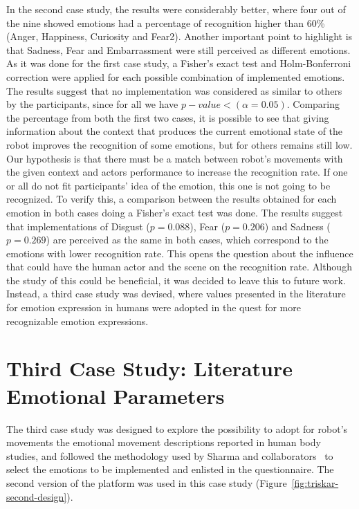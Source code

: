 In the second case study, the results were considerably better, where four out of the nine showed emotions had a percentage of recognition higher than 60\% (Anger, Happiness, Curiosity and Fear2). Another important point to highlight is that Sadness, Fear and Embarrassment were still perceived as different emotions. As it was done for the first case study, a Fisher's exact test and Holm-Bonferroni correction were applied for each possible combination of implemented emotions. The results suggest that no implementation was considered as similar to others by the participants, since for all we have $p-value<(\alpha = 0.05)$. 
Comparing the percentage from both the first two cases, it is possible to see that giving information about the context that produces the current emotional state of the robot improves the recognition of some emotions, but for others remains still low. Our hypothesis is that there must be a match between robot's movements with the given context and actors performance to increase the recognition rate. If one or all do not fit participants' idea of the emotion, this one is not going to be recognized. To verify this, a comparison between the results obtained for each emotion in both cases doing a Fisher's exact test was done. The results suggest that implementations of Disgust ($p=0.088$), Fear ($p=0.206$) and Sadness ($p=0.269$) are perceived as the same in both cases, which correspond to the emotions with lower recognition rate. This opens the question about the influence that could have the human actor and the scene on the recognition rate. Although the study of this could be beneficial, it was decided to leave this to future work. Instead, a third case study was devised, where values presented in the literature for emotion expression in humans were adopted in the quest for more recognizable emotion expressions.

\section{Third Case Study: Literature Emotional Parameters}

The third case study was designed to explore the possibility to adopt for robot's movements the emotional movement descriptions reported in human body studies, and followed the methodology used by Sharma and collaborators~\cite{Sharma2013} to select the emotions to be implemented and enlisted in the questionnaire. The second version of the platform was used in this case study (Figure~\ref{fig:triskar-second-design}).

